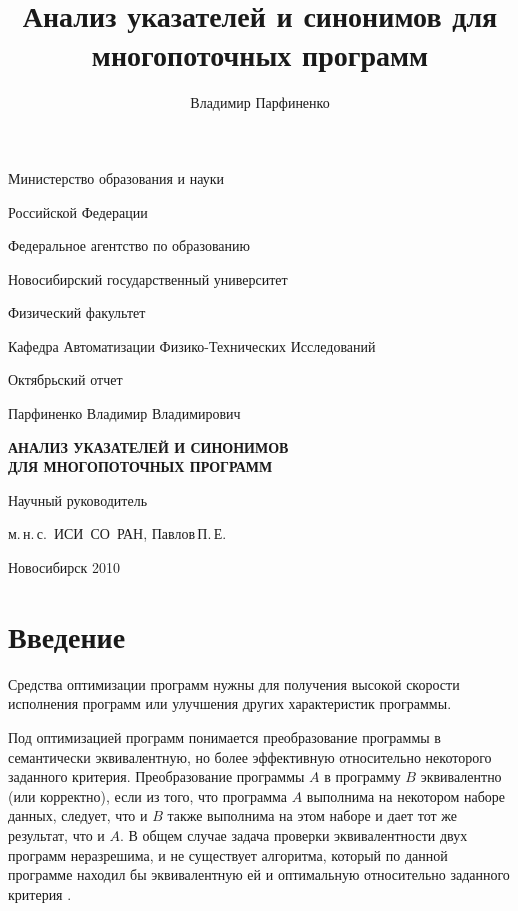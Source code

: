 \documentclass[14pt,titlepage]{extarticle}
\title{
  Анализ указателей и синонимов для многопоточных программ
}
\author{
  Владимир Парфиненко
}
\begin{document}
  \thispagestyle{empty}
  \begin {center}
    Министерство образования и науки

    Российской Федерации

    Федеральное агентство по образованию

    \vspace{0.3cm}

    Новосибирский государственный университет

    \vspace{0.3cm}

    Физический факультет

    Кафедра Автоматизации Физико-Технических Исследований

    \vspace {40mm}

    Октябрьский отчет

    \vspace {10mm}

    Парфиненко Владимир Владимирович

    \vspace {5mm}

    \textbf{АНАЛИЗ УКАЗАТЕЛЕЙ И СИНОНИМОВ\\ ДЛЯ МНОГОПОТОЧНЫХ ПРОГРАММ}

    \vspace {20mm}

    {\raggedleft

    Научный руководитель

    м.\,н.\,с.~ИСИ~СО~РАН, Павлов\,П.\,Е.

    \vspace {50mm}

    Новосибирск 2010}
  \end {center}


  \tableofcontents

  \newpage
  \section{Введение}

    Средства оптимизации программ нужны для получения высокой
    скорости исполнения программ или улучшения других характеристик программы.

    Под оптимизацией программ понимается преобразование программы в
    семантически эквивалентную, но более эффективную относительно некоторого
    заданного критерия.
    Преобразование программы $A$ в программу $B$ эквивалентно (или корректно),
    если из того, что программа $A$ выполнима на некотором наборе данных,
    следует, что и $B$ также выполнима на этом наборе и дает тот же результат,
    что и $A$.
    В общем случае задача проверки эквивалентности двух программ неразрешима,
    и не существует алгоритма, который по данной программе находил бы
    эквивалентную ей и оптимальную относительно заданного критерия
    \cite{kasjanov_translators}.
\end{document}

